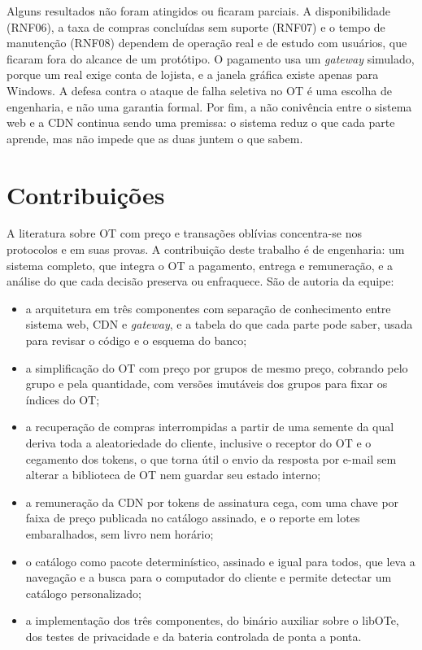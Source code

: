 Alguns resultados não foram atingidos ou ficaram parciais. A disponibilidade
(RNF06), a taxa de compras concluídas sem suporte (RNF07) e o tempo de
manutenção (RNF08) dependem de operação real e de estudo com usuários, que
ficaram fora do alcance de um protótipo. O pagamento usa um \emph{gateway}
simulado, porque um real exige conta de lojista, e a janela gráfica existe
apenas para Windows. A defesa contra o ataque de falha seletiva no OT é uma
escolha de engenharia, e não uma garantia formal. Por fim, a não conivência
entre o sistema web e a CDN continua sendo uma premissa: o sistema reduz o que
cada parte aprende, mas não impede que as duas juntem o que sabem.

\section{Contribuições}

A literatura sobre OT com preço e transações oblívias concentra-se nos
protocolos e em suas provas. A contribuição deste trabalho é de engenharia: um
sistema completo, que integra o OT a pagamento, entrega e remuneração, e a
análise do que cada decisão preserva ou enfraquece. São de autoria da equipe:

\begin{itemize}
\item a arquitetura em três componentes com separação de conhecimento entre
sistema web, CDN e \emph{gateway}, e a tabela do que cada parte pode saber,
usada para revisar o código e o esquema do banco;
\item a simplificação do OT com preço por grupos de mesmo preço, cobrando pelo
grupo e pela quantidade, com versões imutáveis dos grupos para fixar os
índices do OT;
\item a recuperação de compras interrompidas a partir de uma semente da qual
deriva toda a aleatoriedade do cliente, inclusive o receptor do OT e o
cegamento dos tokens, o que torna útil o envio da resposta por e-mail sem
alterar a biblioteca de OT nem guardar seu estado interno;
\item a remuneração da CDN por tokens de assinatura cega, com uma chave por
faixa de preço publicada no catálogo assinado, e o reporte em lotes
embaralhados, sem livro nem horário;
\item o catálogo como pacote determinístico, assinado e igual para todos, que
leva a navegação e a busca para o computador do cliente e permite detectar um
catálogo personalizado;
\item a implementação dos três componentes, do binário auxiliar sobre o libOTe,
dos testes de privacidade e da bateria controlada de ponta a ponta.
\end{itemize}

